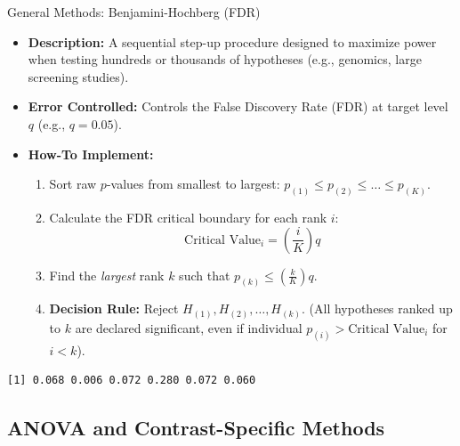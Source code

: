 \begin{frame}{General Methods: Benjamini-Hochberg (FDR)}
  \begin{itemize}
    \item \textbf{Description:} A sequential step-up procedure designed to maximize power when testing hundreds or thousands of hypotheses (e.g., genomics, large screening studies).
    \item \textbf{Error Controlled:} Controls the \alert{False Discovery Rate (FDR)} at target level $q$ (e.g., $q = 0.05$).
    \item \textbf{How-To Implement:}
    \begin{enumerate}
      \item Sort raw $p$-values from smallest to largest: $p_{(1)} \le p_{(2)} \le \dots \le p_{(K)}$.
      \item Calculate the FDR critical boundary for each rank $i$:
      $$
      \text{Critical Value}_i = \left(\frac{i}{K}\right) q
      $$
      \item Find the \emph{largest} rank $k$ such that $p_{(k)} \le \left(\frac{k}{K}\right) q$.
      \item \textbf{Decision Rule:} Reject $H_{(1)}, H_{(2)}, \dots, H_{(k)}$. (All hypotheses ranked up to $k$ are declared significant, even if individual $p_{(i)} > \text{Critical Value}_i$ for $i < k$).
    \end{enumerate}
  \end{itemize}
  
\begin{knitrout}\small
{}\color{fgcolor}\begin{kframe}
\begin{alltt}
\hldef{(}
  \hldef{(}\hldef{,} \hldef{,} \hldef{,} \hldef{,} \hldef{,} \hldef{),}
   \hldef{=}   
\hldef{)}
\end{alltt}
\begin{verbatim}
[1] 0.068 0.006 0.072 0.280 0.072 0.060
\end{verbatim}
\end{kframe}
\end{knitrout}
  
\end{frame}

\subsection{ANOVA and Contrast-Specific Methods}

